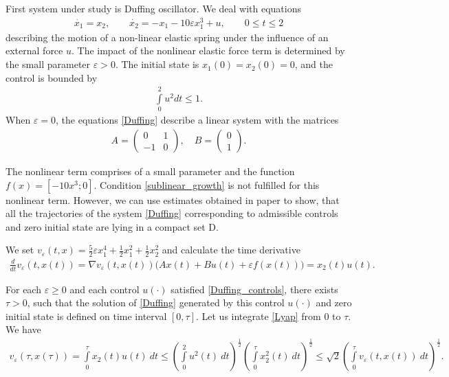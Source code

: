 \documentclass[../main.tex]{subfiles}
\begin{document}
\begin{pr}
	First system under study is  Duffing oscillator. We deal with equations 
	\begin{gather}\label{Duffing}
		\dot{x_1} = x_2, \qquad
		\dot{x_2} = -x_1 - 10 \varepsilon x_1^3 + u ,\qquad 0\leqslant t  \leqslant 2
	\end{gather}
	describing the motion of a non-linear elastic spring under the influence of an external force $u$. The impact of the nonlinear elastic force term is determined by the small parameter $\varepsilon > 0$. The initial state is $x_1(0) = x_2(0) = 0 $, and the control is bounded by 
	\begin{gather}\label{Duffing_controls}
		\int\limits_0^2u^2dt \leqslant 1.
	\end{gather}
	When $\varepsilon = 0$, the equations \eqref{Duffing} describe a linear system with the matrices 
	\begin{gather*}
		A = \begin{pmatrix} 0 & 1\\
			-1 & 0
		\end{pmatrix}, \quad B = \begin{pmatrix}
			0\\
			1
		\end{pmatrix}.
	\end{gather*}
	
	The nonlinear term comprises of a small parameter and the function $f(x) = [-10x^3;0]$. Condition \eqref{sublinear_growth} is not fulfilled for this nonlinear term. However, we can use estimates obtained in paper \cite{Zykov2019} to show, that all the trajectories of the system \eqref{Duffing} corresponding to admissible controls and zero initial state are lying in a compact set D. 
	
	We set $v_{\varepsilon}(t,x) = \frac{5}{2}\varepsilon x_1^4 + \frac{1}{2}x_1^2 + \frac{1}{2}x_2^2$ and calculate the time derivative 
	\begin{gather}\label{Lyap}
		\frac{d}{dt} v_{\varepsilon}(t,x(t)) = \nabla v_{\varepsilon}(t,x(t)) \big(A x(t) + B u(t) + \varepsilon f(x(t))\big) = x_2(t) u(t). 
	\end{gather} 
	
	For each $\varepsilon \geqslant 0$ and each control $u(\cdot)$ satisfied \eqref{Duffing_controls}, there exists $\tau>0$, such that the solution of \eqref{Duffing} generated by this control $u(\cdot)$ and zero initial state is defined on time interval $[0, \tau]$. Let us integrate \eqref{Lyap} from $0$ to $\tau$. We have 
	\begin{gather*}
		v_{\varepsilon}(\tau,x(\tau)) =
		\int\limits_0^{\tau} x_2(t) u(t) \ dt 
		\leqslant 
		\left(\int\limits_0^2 u^2(t) \ dt \right)^{\frac{1}{2}} \left(\int\limits_0^{\tau} x_2^2(t) \ dt \right)^{\frac{1}{2}} \leqslant \sqrt{2} \left(\int\limits_0^{\tau} v_{\varepsilon}(t,x(t)) \ dt \right)^{\frac{1}{2}}.
	\end{gather*}
	

\end{pr}
\end{document}
